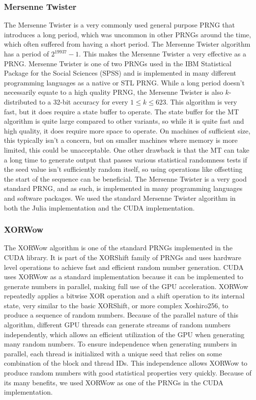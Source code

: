 \documentclass{article}
\begin{document}
            \subsubsection{Mersenne Twister}
 
The Mersenne Twister is a very commonly used general purpose PRNG that introduces a long period, which was uncommon in other PRNGs around the time, which often suffered from having a short period. The Mersenne Twister algorithm has a period of $2^19937-1$. This makes the Mersenne Twister a very effective as a PRNG. Mersenne Twister is one of two PRNGs used in the IBM Statistical Package for the Social Sciences (SPSS) and is implemented in many different programming languages as a native or STL PRNG. While a long period doesn't necessarily equate to a high quality PRNG, the Mersenne Twister is also $k$-distributed to a 32-bit accuracy for every $1\leq k\leq623$. This algorithm is very fast, but it does require a state buffer to operate. The state buffer for the MT algorithm is quite large compared to other variants, so while it is quite fast and high quality, it does require more space to operate. On machines of sufficient size, this typically isn't a concern, but on smaller machines where memory is more limited, this could be unacceptable. One other drawback is that the MT can take a long time to generate output that passes various statistical randomness tests if the seed value isn't sufficiently random itself, so using operations like offsetting the start of the sequence can be beneficial. The Mersenne Twister is a very good standard PRNG, and as such, is implemented in many programming languages and software packages. We used the standard Mersenne Twister algorithm in both the Julia implementation and the CUDA implementation.

            \subsubsection{XORWow}

The XORWow algorithm is one of the standard PRNGs implemented in the CUDA library. It is part of the XORShift family of PRNGs and uses hardware level operations to achieve fast and efficient random number generation. CUDA uses XORWow as a standard implementation because it can be implemented to generate numbers in parallel, making full use of the GPU acceleration. XORWow repeatedly applies a bitwise XOR operation and a shift operation to its internal state, very similar to the basic XORShift, or more complex Xoshiro256, to produce a sequence of random numbers. Because of the parallel nature of this algorithm, different GPU threads can generate streams of random numbers independently, which allows an efficient utilization of the GPU when generating many random numbers. To ensure independence when generating numbers in parallel, each thread is initialized with a unique seed that relies on some combination of the block and thread IDs. This independence allows XORWow to produce random numbers with good statistical properties very quickly. Because of its many benefits, we used XORWow as one of the PRNGs in the CUDA implementation.
\end{document}
